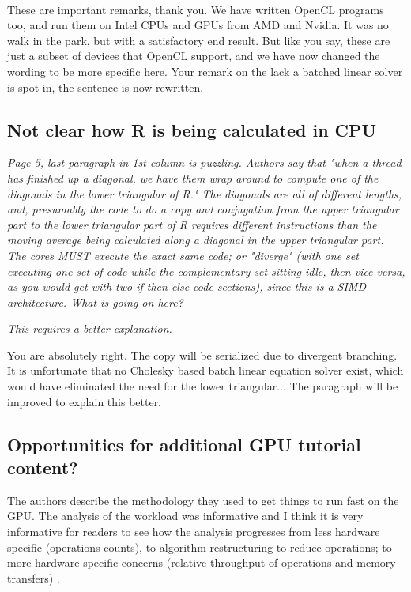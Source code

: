 \documentclass[11pt]{article} %
\newcommand\1{\vec 1}
\newcommand\q[1]{\textit{#1}}
\newcommand\ans[1]{#1}
\newcommand\ai[1]{\\[.5\baselineskip]\ans{#1}}
\begin{document}
\begin{enumerate}
\ai{These are important remarks, thank you. We have written OpenCL programs too, and run them on Intel CPUs and GPUs from AMD and Nvidia. It was no walk in the park, but with a satisfactory end result. But like you say, these are just a subset of devices that OpenCL support, and we have now changed the wording to be more specific here. Your remark on the lack a batched linear solver is spot in, the sentence is now rewritten.}
\end{enumerate}
 
\subsection{Not clear how R is being calculated in CPU}

\q{
Page 5, last paragraph in 1st column is puzzling. Authors say that "when a thread has finished up a diagonal, we have them wrap around to compute one of the diagonals in the lower triangular of R." The diagonals are all of different lengths, and, presumably the code to do a copy and conjugation from the upper triangular part to the lower triangular part of R requires different instructions than the moving average being calculated along a diagonal in the upper triangular part. The cores MUST execute the exact same code; or "diverge" (with one set executing one set of code while the complementary set sitting idle, then vice versa, as you would get with two if-then-else code sections), since this is a SIMD architecture. What is going on here?}

\q{This requires a better explanation.}

\ans{You are absolutely right. The copy will be serialized due to divergent branching. It is unfortunate that no Cholesky based batch linear equation solver exist, which would have eliminated the need for the lower triangular... The paragraph will be improved to explain this better.}

\subsection{Opportunities for additional GPU tutorial content?}

The authors describe the methodology they used to get things to run fast on the GPU. The analysis of the workload was informative and I think it is very informative for readers to see how the analysis progresses from less hardware specific (operations counts), to algorithm restructuring to reduce operations; to more hardware specific concerns (relative throughput of operations and memory transfers) . 
\end{document}

